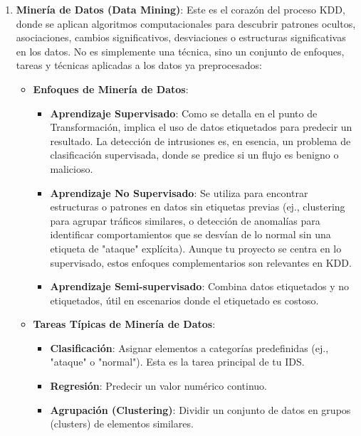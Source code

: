\begin{enumerate}
    \item\textbf{Minería de Datos (Data Mining)}: Este es el corazón del proceso KDD, donde se aplican algoritmos computacionales para descubrir patrones ocultos, asociaciones, cambios significativos, desviaciones o estructuras significativas en los datos. No es simplemente una técnica, sino un conjunto de enfoques, tareas y técnicas aplicadas a los datos ya preprocesados:
    \begin{itemize}

    \item\textbf{Enfoques de Minería de Datos}:
        \begin{itemize}
        
            \item\textbf{Aprendizaje Supervisado}: Como se detalla en el punto de Transformación, implica el uso de datos etiquetados para predecir un resultado. La detección de intrusiones es, en esencia, un problema de clasificación supervisada, donde se predice si un flujo es benigno o malicioso.
            
            \item\textbf{Aprendizaje No Supervisado}: Se utiliza para encontrar estructuras o patrones en datos sin etiquetas previas (ej., clustering para agrupar tráficos similares, o detección de anomalías para identificar comportamientos que se desvían de lo normal sin una etiqueta de "ataque" explícita). Aunque tu proyecto se centra en lo supervisado, estos enfoques complementarios son relevantes en KDD.
            
            \item\textbf{Aprendizaje Semi-supervisado}: Combina datos etiquetados y no etiquetados, útil en escenarios donde el etiquetado es costoso.
            
        \end{itemize}

    \item\textbf{Tareas Típicas de Minería de Datos}:
        \begin{itemize}
        
            \item\textbf{Clasificación}: Asignar elementos a categorías predefinidas (ej., "ataque" o "normal"). Esta es la tarea principal de tu IDS.
            
            \item\textbf{Regresión}: Predecir un valor numérico continuo.
            
            \item\textbf{Agrupación (Clustering)}: Dividir un conjunto de datos en grupos (clusters) de elementos similares.
            

\end{itemize}
\end{itemize}
\end{enumerate}
